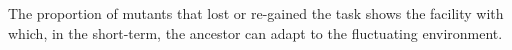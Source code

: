 The proportion of mutants that lost or re-gained the task shows the facility with which, in the short-term, the ancestor can adapt to the fluctuating environment.